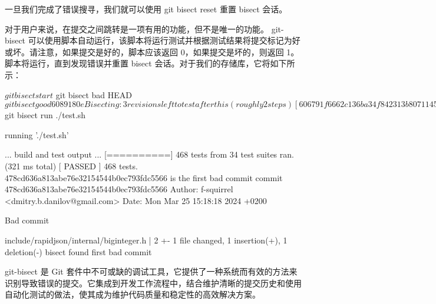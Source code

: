 一旦我们完成了错误搜寻，我们就可以使用 git bisect reset 重置 bisect 会话。

对于用户来说，在提交之间跳转是一项有用的功能，但不是唯一的功能。 git-bisect 可以使用脚本自动运行，该脚本将运行测试并根据测试结果将提交标记为好或坏。请注意，如果提交是好的，脚本应该返回 0，如果提交是坏的，则返回 1。脚本将运行，直到发现错误并重置 bisect 会话。对于我们的存储库，它将如下所示：

\begin{shell}
$ git bisect start
$ git bisect bad HEAD
$ git bisect good 6089180e

Bisecting: 3 revisions left to test after this (roughly 2 steps)
[606791f6662c136ba34f842313b807114580852d] Fix static_cast in regex.h

$ git bisect run ./test.sh

running './test.sh'

... build and test output ...
[==========] 468 tests from 34 test suites ran. (321 ms total)
[ PASSED ] 468 tests.
478cd636a813abe76e32154544b0ec793fdc5566 is the first bad commit
commit 478cd636a813abe76e32154544b0ec793fdc5566
Author: f-squirrel <dmitry.b.danilov@gmail.com>
Date: Mon Mar 25 15:18:18 2024 +0200

    Bad commit

 include/rapidjson/internal/biginteger.h | 2 +-
 1 file changed, 1 insertion(+), 1 deletion(-)
bisect found first bad commit
\end{shell}

git-bisect 是 Git 套件中不可或缺的调试工具，它提供了一种系统而有效的方法来识别导致错误的提交。它集成到开发工作流程中，结合维护清晰的提交历史和使用自动化测试的做法，使其成为维护代码质量和稳定性的高效解决方案。





















